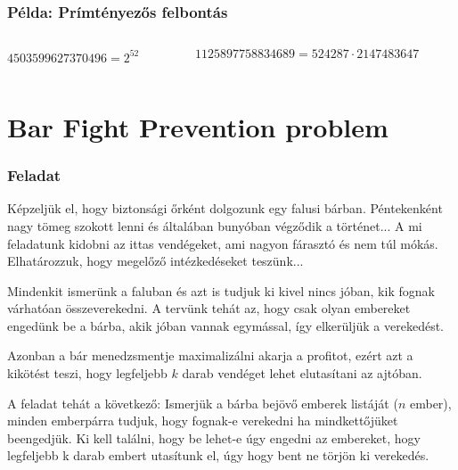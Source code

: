 \documentclass[aspectratio=169]{beamer}
\begin{document}
\begin{frame}
\frametitle{Példa: Prímtényezős felbontás}
\begin{columns}
\begin{column}{0.5\textwidth}
$4503599627370496 = 2^{52}$
\end{column}
\begin{column}{0.5\textwidth}
$1125897758834689 = 524287 \cdot 2147483647$
\end{column}
\end{columns}

\end{frame}


\section{Bar Fight Prevention problem}

\begin{frame}
\frametitle{Feladat}
Képzeljük el, hogy biztonsági őrként dolgozunk egy falusi bárban. Péntekenként nagy tömeg szokott lenni és
általában bunyóban végződik a történet... A mi feladatunk kidobni az ittas vendégeket, ami nagyon fárasztó
és nem túl mókás. Elhatározzuk, hogy megelőző intézkedéseket teszünk...

Mindenkit ismerünk a faluban és azt is tudjuk ki kivel nincs jóban, kik fognak várhatóan összeverekedni.
A tervünk tehát az, hogy csak olyan embereket engedünk be a bárba, akik jóban vannak egymással, így
elkerüljük a verekedést.

Azonban a bár menedzsmentje maximalizálni akarja a profitot, ezért azt a kikötést teszi, hogy legfeljebb
$k$ darab vendéget lehet elutasítani az ajtóban.

A feladat tehát a következő: Ismerjük a bárba bejövő emberek listáját ($n$ ember), minden emberpárra
tudjuk, hogy fognak-e verekedni ha mindkettőjüket beengedjük. Ki kell találni, hogy be lehet-e úgy
engedni az embereket, hogy legfeljebb k darab embert utasítunk el, úgy hogy bent ne törjön ki verekedés.
\end{frame}
\end{document}
